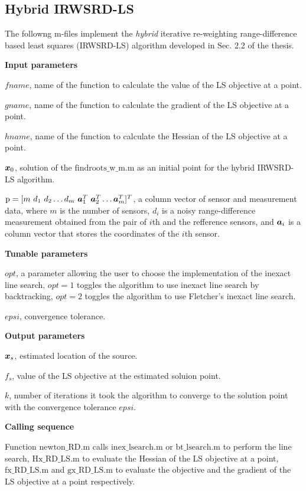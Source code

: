 \subsection{Hybrid IRWSRD-LS}

The followng m-files implement the \textit{hybrid} iterative re-weighting range-difference based least squares (IRWSRD-LS) algorithm developed in Sec. 2.2 of the thesis. 

\phantom{m}

\noindent
\textbf{Input parameters}

\noindent
$fname$, name of the function to calculate the value of the LS objective at a point.

\noindent
$gname$, name of the function to calculate the gradient of the LS objective at a point.

\noindent
$hname$, name of the function to calculate the Hessian of the LS objective at a point.


\noindent
$\mbox{\boldmath$x$}_0$, solution of the $\mbox{findroots\_w\_m.m}$ as an initial point for the hybrid IRWSRD-LS algorithm.


\noindent
$\mbox{p} = [m \ d_1 \ d_2 \ldots d_m \ \Ba_1^T \ \Ba_2^T \ldots \Ba_m^T]^T$, a column vector of sensor and measurement data, where $m$ is the number of sensors, $d_i$ is a noisy range-difference measurement obtained from the pair of $i$th and the refference sensors, and $\mbox{\boldmath$a$}_i$ is a column vector that stores the coordinates of the $i$th sensor.


\noindent
\textbf{Tunable parameters}

\noindent
$opt$, a parameter allowing the user to choose the implementation of the inexact line search, $opt = 1$ toggles the algorithm to use inexact line search by backtracking, $opt = 2$ toggles the algorithm to use Fletcher's inexact line search.

\noindent
$epsi$, convergence tolerance.

\noindent
\textbf{Output parameters}

\noindent
$\mbox{\boldmath$x$}_s$, estimated location of the source.

\noindent
$f_s$, value of the LS objective at the estimated soluion point.

\noindent
$k$, number of iterations it took the algorithm to  converge to the solution point with the convergence tolerance $epsi$.

\noindent
\textbf{Calling sequence}

\noindent
Function $\mbox{newton\_RD.m}$ calls $\mbox{inex\_lsearch.m}$ or $\mbox{bt\_lsearch.m}$ to perform the line search, $\mbox{Hx\_RD\_LS.m}$ to evaluate the Hessian of the LS objective at a point, $\mbox{fx\_RD\_LS.m}$ and $\mbox{gx\_RD\_LS.m}$ to evaluate the objective and the gradient of the LS objective at a point respectively.  

